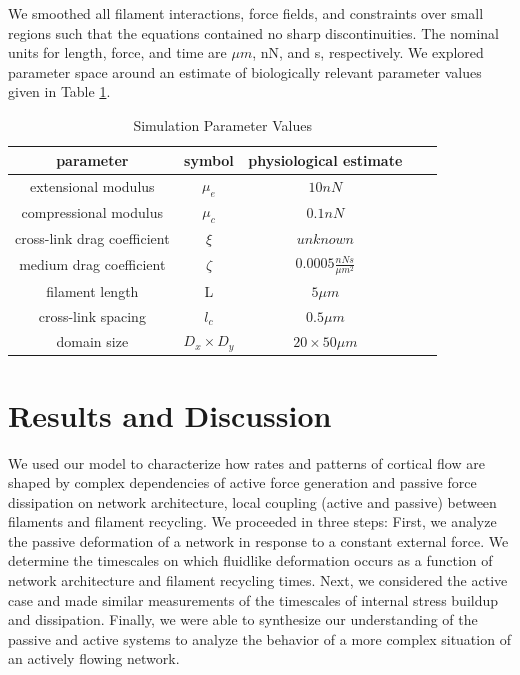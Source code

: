 \documentclass[10pt,letterpaper]{article}
\begin{document}
We smoothed all filament interactions, force fields, and constraints over small regions such that the equations contained no sharp discontinuities. The nominal units for length, force, and time are $\mu m$, nN, and s, respectively.  We explored parameter space around an estimate of biologically relevant parameter values given in Table \ref{table:para}. 

\begin{table}[h]
\centering
\caption{Simulation Parameter Values}
\label{table:para}
\begin{tabular}{|c|c|c|c|c|}
\hline
{\bf parameter}             & {\bf symbol} & {\bf physiological estimate}          \\ \hline
extensional modulus         & $\mu_e$        & $10 nN $                                               \\
compressional modulus             & $\mu_c$     & $ 0.1 nN $                           \\
cross-link drag coefficient & $\xi$      & $unknown $              \\
medium drag coefficient     & $\zeta$        & $0.0005 \frac{nN s}{\mu m^2} $      \\
filament length             & L            & $5 \mu m$                                          \\
cross-link spacing          & $l_c$        & $0.5 \mu m$                                         \\
domain size                 & $D_x\times D_y$            & $20\times 50 \mu m$                                 \\ \hline
\end{tabular}
\end{table}



\section*{Results and Discussion}
We used our model to characterize how rates and patterns of cortical flow are shaped by complex dependencies of active force generation and passive force dissipation on network architecture, local coupling (active and passive) between filaments and filament recycling.  We proceeded in three steps:  First, we analyze the passive deformation of a network in response to a constant external force.  We determine the timescales on which fluidlike deformation occurs as a function of network architecture and filament recycling times.  Next, we considered the active case and made similar measurements of the timescales of internal stress buildup and dissipation. Finally, we were able to synthesize our understanding of the passive and active systems to analyze the behavior of a more complex situation of an actively flowing network.
\end{document}
